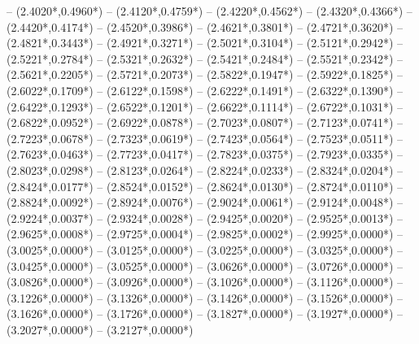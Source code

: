 {	-- ({2.4020*\dx},{0.4960*\dy})
	-- ({2.4120*\dx},{0.4759*\dy})
	-- ({2.4220*\dx},{0.4562*\dy})
	-- ({2.4320*\dx},{0.4366*\dy})
	-- ({2.4420*\dx},{0.4174*\dy})
	-- ({2.4520*\dx},{0.3986*\dy})
	-- ({2.4621*\dx},{0.3801*\dy})
	-- ({2.4721*\dx},{0.3620*\dy})
	-- ({2.4821*\dx},{0.3443*\dy})
	-- ({2.4921*\dx},{0.3271*\dy})
	-- ({2.5021*\dx},{0.3104*\dy})
	-- ({2.5121*\dx},{0.2942*\dy})
	-- ({2.5221*\dx},{0.2784*\dy})
	-- ({2.5321*\dx},{0.2632*\dy})
	-- ({2.5421*\dx},{0.2484*\dy})
	-- ({2.5521*\dx},{0.2342*\dy})
	-- ({2.5621*\dx},{0.2205*\dy})
	-- ({2.5721*\dx},{0.2073*\dy})
	-- ({2.5822*\dx},{0.1947*\dy})
	-- ({2.5922*\dx},{0.1825*\dy})
	-- ({2.6022*\dx},{0.1709*\dy})
	-- ({2.6122*\dx},{0.1598*\dy})
	-- ({2.6222*\dx},{0.1491*\dy})
	-- ({2.6322*\dx},{0.1390*\dy})
	-- ({2.6422*\dx},{0.1293*\dy})
	-- ({2.6522*\dx},{0.1201*\dy})
	-- ({2.6622*\dx},{0.1114*\dy})
	-- ({2.6722*\dx},{0.1031*\dy})
	-- ({2.6822*\dx},{0.0952*\dy})
	-- ({2.6922*\dx},{0.0878*\dy})
	-- ({2.7023*\dx},{0.0807*\dy})
	-- ({2.7123*\dx},{0.0741*\dy})
	-- ({2.7223*\dx},{0.0678*\dy})
	-- ({2.7323*\dx},{0.0619*\dy})
	-- ({2.7423*\dx},{0.0564*\dy})
	-- ({2.7523*\dx},{0.0511*\dy})
	-- ({2.7623*\dx},{0.0463*\dy})
	-- ({2.7723*\dx},{0.0417*\dy})
	-- ({2.7823*\dx},{0.0375*\dy})
	-- ({2.7923*\dx},{0.0335*\dy})
	-- ({2.8023*\dx},{0.0298*\dy})
	-- ({2.8123*\dx},{0.0264*\dy})
	-- ({2.8224*\dx},{0.0233*\dy})
	-- ({2.8324*\dx},{0.0204*\dy})
	-- ({2.8424*\dx},{0.0177*\dy})
	-- ({2.8524*\dx},{0.0152*\dy})
	-- ({2.8624*\dx},{0.0130*\dy})
	-- ({2.8724*\dx},{0.0110*\dy})
	-- ({2.8824*\dx},{0.0092*\dy})
	-- ({2.8924*\dx},{0.0076*\dy})
	-- ({2.9024*\dx},{0.0061*\dy})
	-- ({2.9124*\dx},{0.0048*\dy})
	-- ({2.9224*\dx},{0.0037*\dy})
	-- ({2.9324*\dx},{0.0028*\dy})
	-- ({2.9425*\dx},{0.0020*\dy})
	-- ({2.9525*\dx},{0.0013*\dy})
	-- ({2.9625*\dx},{0.0008*\dy})
	-- ({2.9725*\dx},{0.0004*\dy})
	-- ({2.9825*\dx},{0.0002*\dy})
	-- ({2.9925*\dx},{0.0000*\dy})
	-- ({3.0025*\dx},{0.0000*\dy})
	-- ({3.0125*\dx},{0.0000*\dy})
	-- ({3.0225*\dx},{0.0000*\dy})
	-- ({3.0325*\dx},{0.0000*\dy})
	-- ({3.0425*\dx},{0.0000*\dy})
	-- ({3.0525*\dx},{0.0000*\dy})
	-- ({3.0626*\dx},{0.0000*\dy})
	-- ({3.0726*\dx},{0.0000*\dy})
	-- ({3.0826*\dx},{0.0000*\dy})
	-- ({3.0926*\dx},{0.0000*\dy})
	-- ({3.1026*\dx},{0.0000*\dy})
	-- ({3.1126*\dx},{0.0000*\dy})
	-- ({3.1226*\dx},{0.0000*\dy})
	-- ({3.1326*\dx},{0.0000*\dy})
	-- ({3.1426*\dx},{0.0000*\dy})
	-- ({3.1526*\dx},{0.0000*\dy})
	-- ({3.1626*\dx},{0.0000*\dy})
	-- ({3.1726*\dx},{0.0000*\dy})
	-- ({3.1827*\dx},{0.0000*\dy})
	-- ({3.1927*\dx},{0.0000*\dy})
	-- ({3.2027*\dx},{0.0000*\dy})
	-- ({3.2127*\dx},{0.0000*\dy})
}
